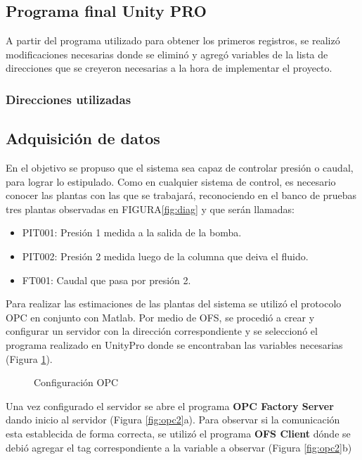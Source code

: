 \subsection{Programa final Unity PRO}

A partir del programa utilizado para obtener los primeros registros, se realizó modificaciones necesarias donde se eliminó y agregó variables de la lista de direcciones que se creyeron necesarias a la hora de implementar el proyecto.\\


\subsubsection{Direcciones utilizadas}


\subsection{Adquisición de datos}
En el objetivo se propuso que el sistema sea capaz de controlar presión o caudal, para lograr lo estipulado. Como en cualquier sistema de control, es necesario conocer las plantas con las que se trabajará, reconociendo en el banco de pruebas tres plantas observadas en  FIGURA\ref{fig:diag} y que serán llamadas:
\begin{itemize}
	\item PIT001: Presión 1 medida a la salida de la bomba.
	\item PIT002: Presión 2 medida luego de la columna que deiva el fluido.
	\item FT001: Caudal que pasa por presión 2.
\end{itemize}
Para realizar las estimaciones de las plantas del sistema se utilizó el protocolo OPC en conjunto con Matlab. Por medio de OFS, se procedió a crear y configurar un servidor con la dirección correspondiente y se seleccionó el programa realizado en UnityPro donde se encontraban las variables necesarias (Figura \ref{fig:opc1}).

\begin{figure}[htbp]
	\centering
	\caption{Configuración OPC} \label{fig:opc1}
\end{figure}


Una vez configurado el servidor se abre el programa \textbf{OPC Factory Server} dando inicio al servidor (Figura \ref{fig:opc2}a). Para observar si la comunicación esta establecida de forma correcta, se utilizó el programa \textbf{OFS Client} dónde se debió agregar el tag correspondiente a la variable a observar (Figura \ref{fig:opc2}b)

